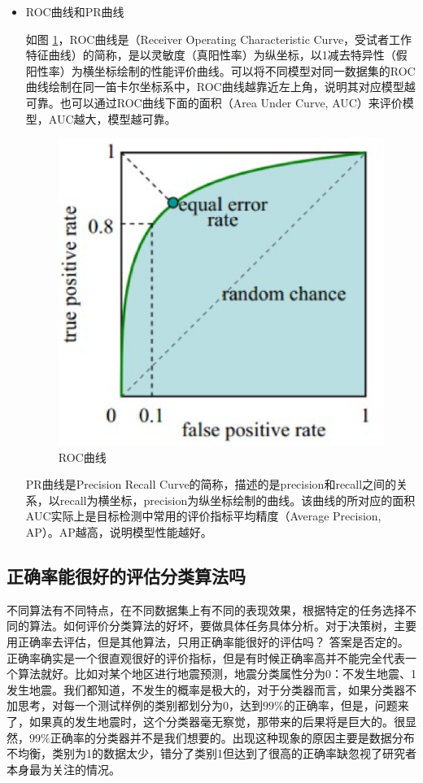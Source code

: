 \begin{itemize}
\item ROC曲线和PR曲线

	如图 \ref{fig:2.3}，ROC曲线是（Receiver Operating Characteristic Curve，受试者工作特征曲线）的简称，是以灵敏度（真阳性率）为纵坐标，以1减去特异性（假阳性率）为横坐标绘制的性能评价曲线。可以将不同模型对同一数据集的ROC曲线绘制在同一笛卡尔坐标系中，ROC曲线越靠近左上角，说明其对应模型越可靠。也可以通过ROC曲线下面的面积（Area Under Curve, AUC）来评价模型，AUC越大，模型越可靠。

 \begin{figure}[h]
   \centering
   \includegraphics[width=.7\textwidth]{imgs/2.7.3.eps}
   \caption{ROC曲线}
   \label{fig:2.3}
 \end{figure}

PR曲线是Precision Recall Curve的简称，描述的是precision和recall之间的关系，以recall为横坐标，precision为纵坐标绘制的曲线。该曲线的所对应的面积AUC实际上是目标检测中常用的评价指标平均精度（Average Precision, AP）。AP越高，说明模型性能越好。
\end{itemize}


\subsection{正确率能很好的评估分类算法吗}

不同算法有不同特点，在不同数据集上有不同的表现效果，根据特定的任务选择不同的算法。如何评价分类算法的好坏，要做具体任务具体分析。对于决策树，主要用正确率去评估，但是其他算法，只用正确率能很好的评估吗？
答案是否定的。正确率确实是一个很直观很好的评价指标，但是有时候正确率高并不能完全代表一个算法就好。比如对某个地区进行地震预测，地震分类属性分为0：不发生地震、1发生地震。我们都知道，不发生的概率是极大的，对于分类器而言，如果分类器不加思考，对每一个测试样例的类别都划分为0，达到$99\%$的正确率，但是，问题来了，如果真的发生地震时，这个分类器毫无察觉，那带来的后果将是巨大的。很显然，$99\%$正确率的分类器并不是我们想要的。出现这种现象的原因主要是数据分布不均衡，类别为1的数据太少，错分了类别1但达到了很高的正确率缺忽视了研究者本身最为关注的情况。

